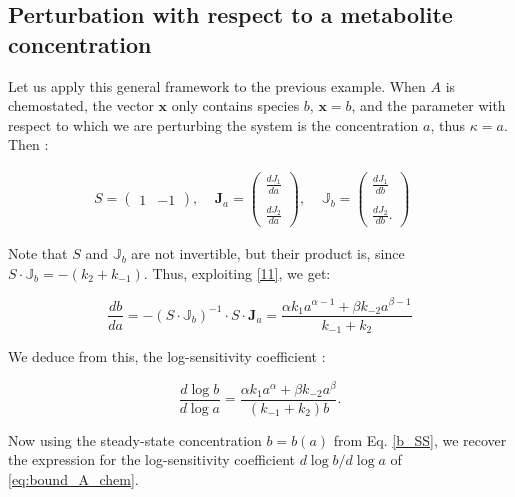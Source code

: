 \documentclass{article}
\begin{document}
	\subsection{Perturbation with respect to a metabolite concentration
	}
	Let us apply this general framework to the previous example.
	When $A$ is chemostated, the vector $\mathbf{x}$ only contains species $b$, $\mathbf{x}=b$, and the parameter with respect to which we are perturbing the system is the concentration $a$, thus $\kappa=a$.
	Then :
	\begin{center}
		\begin{equation}
			\begin{aligned}
				S = \begin{pmatrix}
					1 & -1
				\end{pmatrix}, \ \ \ \ \
				\textbf{J}_a =  \begin{pmatrix}
					\frac{d J_1}{d a} \\ \\
					\frac{d J_2}{d a}
				\end{pmatrix}, \ \ \ \ \
				\mathbb{J}_{b} = \begin{pmatrix}
					\frac{d J_1}{d b} \\ \\
					\frac{d J_2}{d b}.
				\end{pmatrix} \ \ \ \ \
			\end{aligned}
			\label{14}
		\end{equation}
	\end{center}
	
	Note that $S$ and $\mathbb{J}_{b}$ are not invertible, but their product is, since
	$S \cdot \mathbb{J}_{b} = - (k_2 + k_{-1})$.
	Thus, exploiting \eqref{11}, we get:
	\begin{center}
		\begin{equation}
			\frac{d b}{d a} = - \left( S \cdot {\mathbb{J}}_{b} \right)^ {-1} \cdot S \cdot \mathbf{J}_{a} = \frac{\alpha k_1 a^{\alpha-1}+\beta k_{-2} a^{\beta-1}}{k_{-1}+k_2}
		\end{equation}
	\end{center}
	We deduce from this, the log-sensitivity coefficient :
	\begin{center}
		\begin{equation}
			\frac{d \log b}{d \log a} = \frac{\alpha k_1 a^{\alpha}+\beta k_{-2} a^{\beta}}{(k_{-1}+k_2) b}.
		\end{equation}
	\end{center}
	Now using the steady-state concentration $b=b(a)$ from Eq. \ref{b_SS}, we recover the expression for the log-sensitivity coefficient $d\log b/d \log a$ of \eqref{eq:bound_A_chem}.
	
\end{document}
